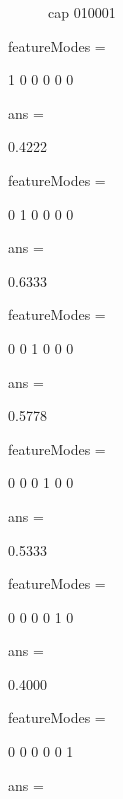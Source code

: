 \begin{figure}[!hbt]
\centering
{}
\caption{cap 010001}
\label{fig:010001}
\end{figure}

featureModes =

     1     0     0     0     0     0


ans =

    0.4222


featureModes =

     0     1     0     0     0     0


ans =

    0.6333


featureModes =

     0     0     1     0     0     0


ans =

    0.5778


featureModes =

     0     0     0     1     0     0


ans =

    0.5333


featureModes =

     0     0     0     0     1     0


ans =

    0.4000


featureModes =

     0     0     0     0     0     1


ans =

